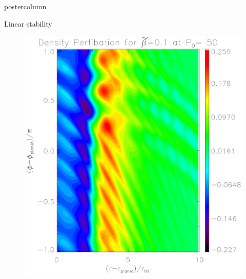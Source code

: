 \documentclass[final,hyperref={pdfpagelabels=false}]{beamer}
\begin{document}
\begin{frame}
\begin{columns}
\begin{column}{.49\textwidth}
\begin{beamercolorbox}[center,wd=\textwidth]{postercolumn}
\begin{minipage}[T]{.95\textwidth}
{\begin{block}{{\Large Linear stability}}
                   \begin{figure}
                    \centering
                    \hfill
                    \begin{minipage}{0.45\textwidth}
                      \includegraphics[width=\textwidth]{Posterfig_lowb}
                    \end{minipage}
                    \hfill
                    \begin{minipage}{0.45\textwidth}

\end{minipage}
\end{figure}
\end{block}}
\end{minipage}
\end{beamercolorbox}
\end{column}
\end{columns}
\end{frame}
\end{document}
